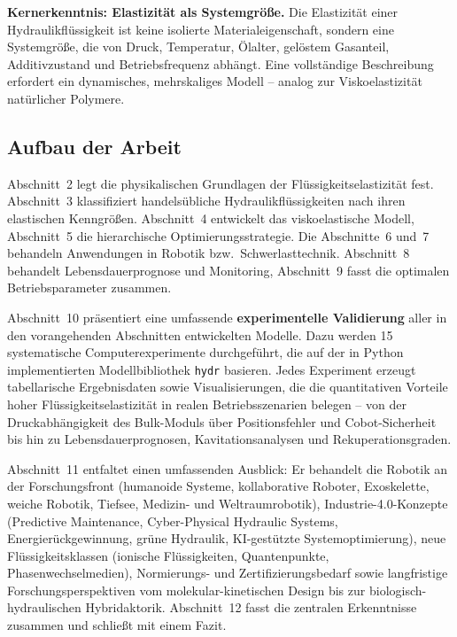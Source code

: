 ﻿\documentclass[a4paper,12pt]{scrreprt}
\theoremstyle{definition}
\begin{document}
\begin{infobox}
\textbf{Kernerkenntnis: Elastizität als Systemgröße.}
Die Elastizität einer Hydraulikflüssigkeit ist keine isolierte Materialeigenschaft,
sondern eine Systemgröße, die von Druck, Temperatur, Ölalter, gelöstem Gasanteil,
Additivzustand und Betriebsfrequenz abhängt. Eine vollständige Beschreibung
erfordert ein dynamisches, mehrskaliges Modell -- analog zur Viskoelastizität
natürlicher Polymere.
\end{infobox}

\subsection{Aufbau der Arbeit}

Abschnitt~2 legt die physikalischen Grundlagen der Flüssigkeitselastizität
fest. Abschnitt~3 klassifiziert handelsübliche Hydraulikflüssigkeiten nach
ihren elastischen Kenngrößen. Abschnitt~4 entwickelt das viskoelastische
Modell, Abschnitt~5 die hierarchische Optimierungsstrategie. Die
Abschnitte~6 und~7 behandeln Anwendungen in Robotik bzw.\
Schwerlasttechnik. Abschnitt~8 behandelt Lebensdauerprognose und Monitoring,
Abschnitt~9 fasst die optimalen Betriebsparameter zusammen.

Abschnitt~10 präsentiert eine umfassende
\textbf{experimentelle Validierung} aller in den vorangehenden Abschnitten
entwickelten Modelle. Dazu werden 15 systematische Computerexperimente
durchgeführt, die auf der in Python implementierten Modellbibliothek
\texttt{hydr} basieren. Jedes Experiment erzeugt tabellarische Ergebnisdaten
sowie Visualisierungen, die die quantitativen Vorteile hoher Flüssigkeitselastizität
in realen Betriebsszenarien belegen -- von der Druckabhängigkeit des
Bulk-Moduls über Positionsfehler und Cobot-Sicherheit bis hin zu
Lebensdauerprognosen, Kavitationsanalysen und Rekuperationsgraden.

Abschnitt~11 entfaltet einen umfassenden Ausblick: Er behandelt die Robotik
an der Forschungsfront (humanoide Systeme, kollaborative Roboter, Exoskelette,
weiche Robotik, Tiefsee, Medizin- und Weltraumrobotik), Industrie-4.0-Konzepte
(Predictive Maintenance, Cyber-Physical Hydraulic Systems, Energierückgewinnung,
grüne Hydraulik, KI-gestützte Systemoptimierung), neue Flüssigkeitsklassen
(ionische Flüssigkeiten, Quantenpunkte, Phasenwechselmedien), Normierungs-
und Zertifizierungsbedarf sowie langfristige Forschungsperspektiven vom
molekular-kinetischen Design bis zur biologisch-hydraulischen Hybridaktorik.
Abschnitt~12 fasst die zentralen Erkenntnisse zusammen und schließt
mit einem Fazit.
\end{document}
